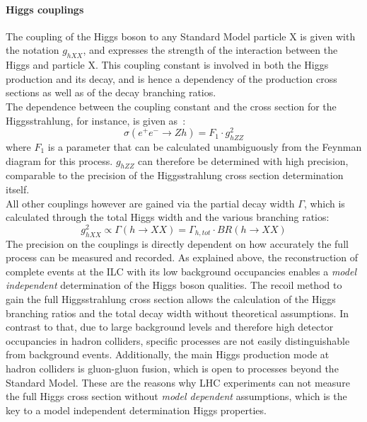 \paragraph{Higgs couplings}
The coupling of the Higgs boson to any Standard Model particle X is given with the notation $g_{hXX}$, and expresses the strength of the interaction between the Higgs and particle X.
This coupling constant is involved in both the Higgs production and its decay, and is hence a dependency of the production cross sections as well as of the decay branching ratios.\\
The dependence between the coupling constant and the cross section for the Higgsstrahlung, for instance, is given as~\cite[p. 4]{PhysicsCase_Junping}:
\begin{equation}
 \sigma(e^+e^-\rightarrow Zh)=F_1\cdot g^2_{hZZ}
\end{equation}
where $F_1$ is a parameter that can be calculated unambiguously from the Feynman diagram for this process.
$g_{hZZ}$ can therefore be determined with high precision, comparable to the precision of the Higgsstrahlung cross section determination itself.\\
All other couplings however are gained via the partial decay width $\Gamma$, which is calculated through the total Higgs width and the various branching ratios:
\begin{equation}
 g^2_{hXX}\propto\Gamma(h\rightarrow XX)=\Gamma_{h,tot}\cdot BR(h\rightarrow XX)
\end{equation}
The precision on the couplings is directly dependent on how accurately the full process can be measured and recorded.
As explained above, the reconstruction of complete events at the ILC with its low background occupancies enables a \textit{model independent} determination of the Higgs boson qualities.
The recoil method to gain the full Higgsstrahlung cross section allows the calculation of the Higgs branching ratios and the total decay width without theoretical assumptions.
In contrast to that, due to large background levels and therefore high detector occupancies in hadron colliders, specific processes are not easily distinguishable from background events.
Additionally, the main Higgs production mode at hadron colliders is gluon-gluon fusion, which is open to processes beyond the Standard Model.
These are the reasons why LHC experiments can not measure the full Higgs cross section without \textit{model dependent} assumptions, which is the key to a model independent determination Higgs properties.\\
